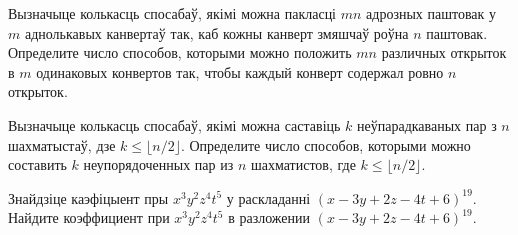 \begin{problemList}
\bigskip

\problemItemSimple
{Вызначыце колькасць спосабаў, якімі можна пакласці $mn$ адрозных
паштовак у $m$ аднолькавых канвертаў так, каб кожны канверт змяшчаў
роўна $n$ паштовак.}
{Определите число способов, которыми можно положить $mn$ различных
открыток в $m$ одинаковых конвертов так, чтобы каждый конверт содержал
ровно $n$ открыток.}

\bigskip

\problemItemSimple
{Вызначыце колькасць спосабаў, якімі можна саставіць $k$ неўпарадкаваных
пар з $n$ шахматыстаў, дзе $k \le \lfloor n/2\rfloor$.}
{Определите число способов, которыми можно составить $k$ неупорядоченных
пар из $n$ шахматистов, где $k \le \lfloor n/2\rfloor$.}

\bigskip

\problemItemSimple
{Знайдзіце каэфіцыент пры $x^3y^2z^4t^5$ у раскладанні $(x - 3y + 2z - 4t + 6)^{19}$.}
{Найдите коэффициент при $x^3y^2z^4t^5$ в разложении $(x - 3y + 2z - 4t + 6)^{19}$.}

\end{problemList}


